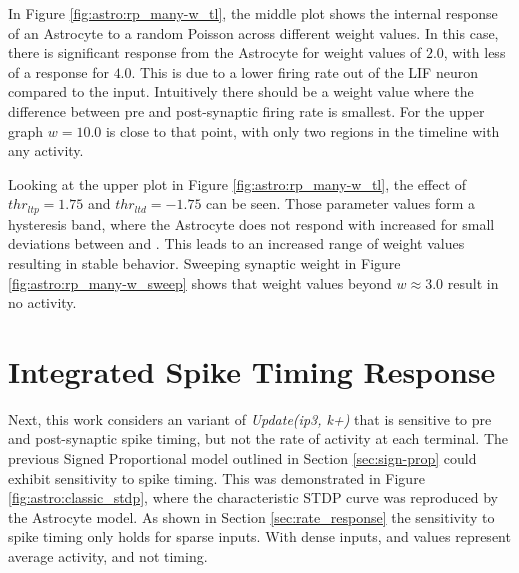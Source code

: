 In Figure \ref{fig:astro:rp_many-w_tl}, the middle plot shows the internal
response of an Astrocyte to a random Poisson across different weight values. In
this case, there is significant response from the Astrocyte for weight values of
$2.0$, with less of a response for $4.0$. This is due to a lower firing rate out
of the LIF neuron compared to the input. Intuitively there should be a weight
value where the difference between pre and post-synaptic firing rate is
smallest. For the upper graph $w=10.0$ is close to that point, with only two
regions in the timeline with any activity.


Looking at the upper plot in Figure \ref{fig:astro:rp_many-w_tl}, the effect of
$thr_{ltp}=1.75$ and $thr_{ltd}=-1.75$ can be seen. Those parameter values form
a hysteresis band, where the Astrocyte does not respond with increased \ca for
small deviations between \ipt and \kp. This leads to an increased range of
weight values resulting in stable behavior. Sweeping synaptic weight in Figure
\ref{fig:astro:rp_many-w_sweep} shows that weight values beyond $w \approx 3.0$
result in no \ca activity.



\section{Integrated Spike Timing Response} \label{section:istp}
Next, this work considers an variant of \emph{Update(ip3, k+)} that is sensitive
to pre and post-synaptic spike timing, but not the rate of activity at each
terminal. The previous Signed Proportional model outlined in Section
\ref{sec:sign-prop} could exhibit sensitivity to spike timing. This was
demonstrated in Figure \ref{fig:astro:classic_stdp}, where the characteristic
STDP curve was reproduced by the Astrocyte model. As shown in Section
\ref{sec:rate_response} the sensitivity to spike timing only holds for sparse
inputs. With dense inputs, \ipt and \kp values represent average activity, and not
timing.

